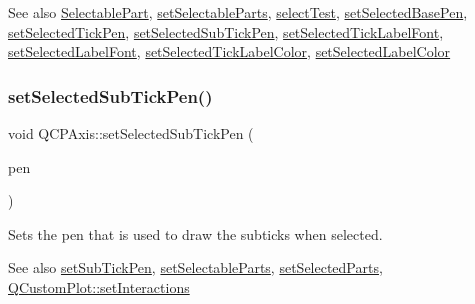 \begin{DoxySeeAlso}{See also}
\hyperlink{class_q_c_p_axis_abee4c7a54c468b1385dfce2c898b115f}{Selectable\+Part}, \hyperlink{class_q_c_p_axis_a513f9b9e326c505d9bec54880031b085}{set\+Selectable\+Parts}, \hyperlink{class_q_c_p_axis_a63b7103c57fe9acfbce164334ea837f8}{select\+Test}, \hyperlink{class_q_c_p_axis_aeb917a909215605b95ef2be843de1ee8}{set\+Selected\+Base\+Pen}, \hyperlink{class_q_c_p_axis_a8360502685eb782edbf04019c9345cdc}{set\+Selected\+Tick\+Pen}, \hyperlink{class_q_c_p_axis_a2a00a7166600155eac26843132eb9576}{set\+Selected\+Sub\+Tick\+Pen}, \hyperlink{class_q_c_p_axis_a845ccb560b7bc5281098a5be494145f6}{set\+Selected\+Tick\+Label\+Font}, \hyperlink{class_q_c_p_axis_a02ec2a75d4d8401eaab834fbc6803d30}{set\+Selected\+Label\+Font}, \hyperlink{class_q_c_p_axis_a9bdbf5e63ab15187f3a1de9440129227}{set\+Selected\+Tick\+Label\+Color}, \hyperlink{class_q_c_p_axis_a5d502dec597c634f491fdd73d151c72d}{set\+Selected\+Label\+Color} 
\end{DoxySeeAlso}
\mbox{\label{class_q_c_p_axis_a2a00a7166600155eac26843132eb9576}} 
\subsubsection{\texorpdfstring{set\+Selected\+Sub\+Tick\+Pen()}{setSelectedSubTickPen()}}
{\footnotesize\ttfamily void Q\+C\+P\+Axis\+::set\+Selected\+Sub\+Tick\+Pen (\begin{DoxyParamCaption}\item[{const Q\+Pen \&}]{pen }\end{DoxyParamCaption})}

Sets the pen that is used to draw the subticks when selected.

\begin{DoxySeeAlso}{See also}
\hyperlink{class_q_c_p_axis_aede4028ae7516bd51a60618a8233f9cf}{set\+Sub\+Tick\+Pen}, \hyperlink{class_q_c_p_axis_a513f9b9e326c505d9bec54880031b085}{set\+Selectable\+Parts}, \hyperlink{class_q_c_p_axis_ab9d7a69277dcbed9119b3c1f25ca19c3}{set\+Selected\+Parts}, \hyperlink{class_q_custom_plot_a5ee1e2f6ae27419deca53e75907c27e5}{Q\+Custom\+Plot\+::set\+Interactions} 
\end{DoxySeeAlso}
\mbox{\label{class_q_c_p_axis_a9bdbf5e63ab15187f3a1de9440129227}} 
